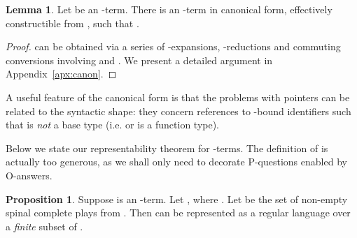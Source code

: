 \documentclass{CSML}
\theoremstyle{definition}\newtheorem{definition}[thm]{Definition}
\theoremstyle{definition}\newtheorem{example}[thm]{Example}
\theoremstyle{definition}\newtheorem{proposition}[thm]{Proposition}
\theoremstyle{definition}\newtheorem{lemma}[thm]{Lemma}
\theoremstyle{definition}\newtheorem{theorem}[thm]{Theorem}
\theoremstyle{definition}\newtheorem{corollary}[thm]{Corollary}
\theoremstyle{definition}\newtheorem{remark}[thm]{Remark}
\newcommand\cutout[1]{}
\begin{document}
\begin{lemma}\label{lem:canon}
Let  be an -term. There is
an -term  in canonical form, effectively
constructible from , such that .
\end{lemma}
\begin{proof}
 can be obtained via a series of -expansions, -reductions and
commuting conversions involving  and . We present a detailed argument in Appendix~\ref{apx:canon}.
\end{proof}
A useful feature of the canonical form is that the problems with pointers 
can be related to the syntactic shape: they concern references to -bound identifiers 
such that  is \emph{not} a base type (i.e.  or  is a function type).
\cutout{The representation scheme for pointers corresponds then to enumerating such  bindings
along branches of the syntactic tree of the canonical form (using  for topmost bindings).}
Below we state our representability theorem for -terms.
The definition of  is actually too generous, as we shall only need  to
decorate P-questions enabled by O-answers.
\begin{proposition}\label{prop:regular}
Suppose  is an -term. Let , 
where .
Let  be the set of non-empty spinal complete plays from .
Then  can be represented as a regular language over a \emph{finite} subset of .
\end{proposition}
\end{document}
